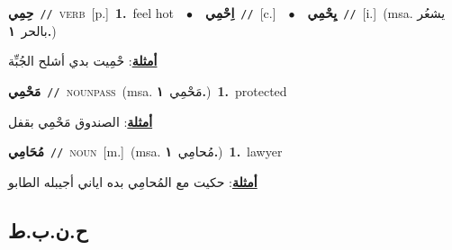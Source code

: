 \documentclass[10pt,a4paper,twoside]{article} %
\begin{document}
\begin{multicols}{2}
{\setlength\topsep{0pt}\textbf{\foreignlanguage{arabic}{حِمِي}}\ {\color{gray}\texttt{//}\color{black}}\ \textsc{verb}\ [p.]\ \textbf{1.}~feel hot\ \ $\bullet$\ \ \setlength\topsep{0pt}\textbf{\foreignlanguage{arabic}{اِحْمِي}}\ {\color{gray}\texttt{//}\color{black}}\ [c.]\ \ $\bullet$\ \ \setlength\topsep{0pt}\textbf{\foreignlanguage{arabic}{يِحْمِي}}\ {\color{gray}\texttt{//}\color{black}}\ [i.]\ \color{gray}(msa. \foreignlanguage{arabic}{يشعُر بالحر}~\foreignlanguage{arabic}{\textbf{١.}})\color{black}\  \begin{flushright}\color{gray}\foreignlanguage{arabic}{\textbf{\underline{\foreignlanguage{arabic}{أمثلة}}}: حْمِيت بدي أشلح الجُبِّة}\end{flushright}\color{black}} \vspace{2mm}

{\setlength\topsep{0pt}\textbf{\foreignlanguage{arabic}{مَحْمِي}}\ {\color{gray}\texttt{//}\color{black}}\ \textsc{noun\textunderscore pass}\ \color{gray}(msa. \foreignlanguage{arabic}{مَحْمِي}~\foreignlanguage{arabic}{\textbf{١.}})\color{black}\ \textbf{1.}~protected\  \begin{flushright}\color{gray}\foreignlanguage{arabic}{\textbf{\underline{\foreignlanguage{arabic}{أمثلة}}}: الصندوق مَحْمِي بقفل}\end{flushright}\color{black}} \vspace{2mm}

{\setlength\topsep{0pt}\textbf{\foreignlanguage{arabic}{مُحَامِي}}\ {\color{gray}\texttt{//}\color{black}}\ \textsc{noun}\ [m.]\ \color{gray}(msa. \foreignlanguage{arabic}{مُحامِي}~\foreignlanguage{arabic}{\textbf{١.}})\color{black}\ \textbf{1.}~lawyer\  \begin{flushright}\color{gray}\foreignlanguage{arabic}{\textbf{\underline{\foreignlanguage{arabic}{أمثلة}}}: حكيت مع المُحامِي بده اياني أجيبله الطابو}\end{flushright}\color{black}} \vspace{2mm}

\vspace{-3mm}
\subsection*{\color{blue}\foreignlanguage{arabic}{ح.ن.ب.ط}\color{blue}{}} 


\end{multicols}
\end{document}
